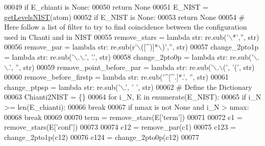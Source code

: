 \begin{DoxyCode}
00049     \textcolor{keywordflow}{if} E\_chianti \textcolor{keywordflow}{is} \textcolor{keywordtype}{None}:
00050         \textcolor{keywordflow}{return} \textcolor{keywordtype}{None}
00051     E\_NIST = \hyperlink{namespacepyneb_1_1utils_1_1manage__atomic__data_ad09376e8676854d44680ae14210b5589}{getLevelsNIST}(atom)
00052     \textcolor{keywordflow}{if} E\_NIST \textcolor{keywordflow}{is} \textcolor{keywordtype}{None}:
00053         \textcolor{keywordflow}{return} \textcolor{keywordtype}{None}
00054     \textcolor{comment}{# Here follow a list of filter to try to find coincidence between the configuration used in Chanti and
       in NIST}
00055     remove\_stars = \textcolor{keyword}{lambda} str: re.sub(\textcolor{stringliteral}{'\(\backslash\)*'},\textcolor{stringliteral}{''}, str)
00056     remove\_par = \textcolor{keyword}{lambda} str: re.sub(\textcolor{stringliteral}{r'\(\backslash\)([^)]*\(\backslash\))'},\textcolor{stringliteral}{''}, str)
00057     change\_2pto1p = \textcolor{keyword}{lambda} str: re.sub(\textcolor{stringliteral}{'\(\backslash\).\(\backslash\).'}, \textcolor{stringliteral}{'.'}, str)
00058     change\_2pto0p = \textcolor{keyword}{lambda} str: re.sub(\textcolor{stringliteral}{'\(\backslash\).\(\backslash\).'}, \textcolor{stringliteral}{''}, str)
00059     remove\_point\_before\_par = \textcolor{keyword}{lambda} str: re.sub(\textcolor{stringliteral}{'\(\backslash\).\(\backslash\)('}, \textcolor{stringliteral}{'('}, str)
00060     remove\_before\_firstp = \textcolor{keyword}{lambda} str: re.sub(\textcolor{stringliteral}{'^[^.]*.'}, \textcolor{stringliteral}{''}, str)
00061     change\_ptpsp = \textcolor{keyword}{lambda} str: re.sub(\textcolor{stringliteral}{'\(\backslash\).'}, \textcolor{stringliteral}{' '}, str)
00062     \textcolor{comment}{# Define the Dictionary}
00063     Chianti2NIST = \{\}
00064     \textcolor{keywordflow}{for} i\_N, E \textcolor{keywordflow}{in} enumerate(E\_NIST):
00065         \textcolor{keywordflow}{if} i\_N >= len(E\_chianti):
00066             \textcolor{keywordflow}{break}
00067         \textcolor{keywordflow}{if} nmax \textcolor{keywordflow}{is} \textcolor{keywordflow}{not} \textcolor{keywordtype}{None} \textcolor{keywordflow}{and} i\_N > nmax:
00068             \textcolor{keywordflow}{break}
00069         
00070         term = remove\_stars(E[\textcolor{stringliteral}{'term'}])
00071 
00072         c1 = remove\_stars(E[\textcolor{stringliteral}{'conf'}])
00073         
00074         c12 = remove\_par(c1)
00075         c123 = change\_2pto1p(c12)
00076         c124 = change\_2pto0p(c12)
00077         

\end{DoxyCode}
